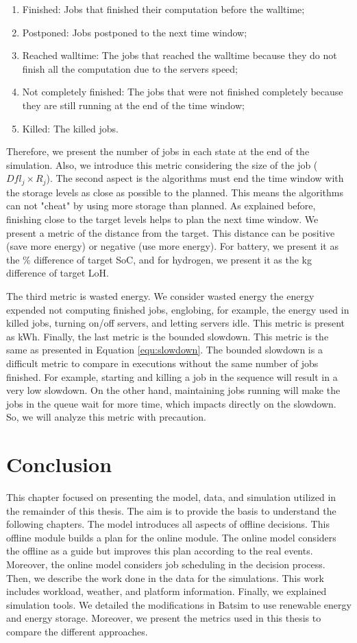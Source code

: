 \begin{enumerate}
    \item Finished: Jobs that finished their computation before the walltime;
    \item Postponed: Jobs postponed to the next time window;
    \item Reached walltime: The jobs that reached the walltime because they do not finish all the computation due to the servers speed;
    \item Not completely finished: The jobs that were not finished completely because they are still running at the end of the time window;
    \item Killed: The killed jobs.
\end{enumerate} 

Therefore, we present the number of jobs in each state at the end of the simulation. Also, we introduce this metric considering the size of the job ($Dfl_j \times R_j$). The second aspect is the algorithms must end the time window with the storage levels as close as possible to the planned. This means the algorithms can not "cheat" by using more storage than planned. As explained before, finishing close to the target levels helps to plan the next time window. We present a metric of the distance from the target. This distance can be positive (save more energy) or negative (use more energy). For battery, we present it as the \% difference of target SoC, and for hydrogen, we present it as the kg difference of target LoH.

The third metric is wasted energy. We consider wasted energy the energy expended not computing finished jobs, englobing, for example, the energy used in killed jobs, turning on/off servers, and letting servers idle. This metric is present as kWh. Finally, the last metric is the bounded slowdown. This metric is the same as presented in Equation \ref{equ:slowdown}. The bounded slowdown is a difficult metric to compare in executions without the same number of jobs finished. For example, starting and killing a job in the sequence will result in a very low slowdown. On the other hand, maintaining jobs running will make the jobs in the queue wait for more time, which impacts directly on the slowdown. So, we will analyze this metric with precaution.

\section{Conclusion}
This chapter focused on presenting the model, data, and simulation utilized in the remainder of this thesis. The aim is to provide the basis to understand the following chapters. The model introduces all aspects of offline decisions. This offline module builds a plan for the online module. The online model considers the offline as a guide but improves this plan according to the real events. Moreover, the online model considers job scheduling in the decision process. Then, we describe the work done in the data for the simulations. This work includes workload, weather, and platform information. Finally, we explained simulation tools. We detailed the modifications in Batsim to use renewable energy and energy storage. Moreover, we present the metrics used in this thesis to compare the different approaches.